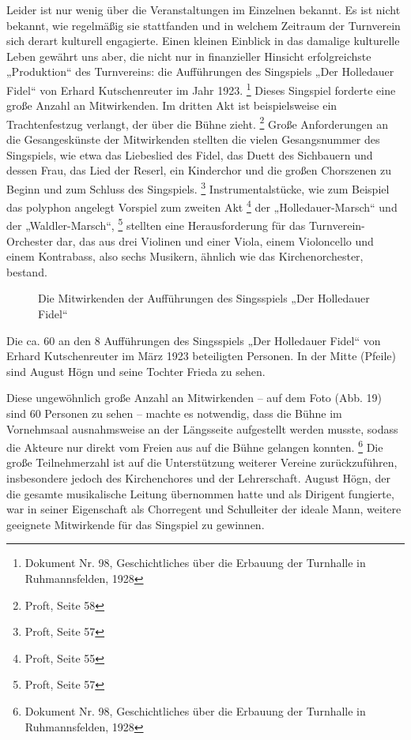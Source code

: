 Leider ist nur wenig über die Veranstaltungen im Einzelnen bekannt. Es
ist nicht bekannt, wie regelmäßig sie stattfanden und in welchem
Zeitraum der Turnverein sich derart kulturell engagierte. Einen kleinen
Einblick in das damalige kulturelle Leben gewährt uns aber, die nicht
nur in finanzieller Hinsicht erfolgreichste „Produktion“ des
Turnvereins: die Aufführungen des Singspiels „Der Holledauer Fidel“ von
Erhard Kutschenreuter im Jahr 1923. \footnote{Dokument Nr. 98,
Geschichtliches über die Erbauung der Turnhalle in Ruhmannsfelden,
1928} Dieses Singspiel forderte eine große Anzahl an Mitwirkenden. Im
dritten Akt ist beispielsweise ein Trachtenfestzug verlangt, der über
die Bühne zieht. \footnote{Proft, Seite 58} Große Anforderungen an die
Gesangeskünste der Mitwirkenden stellten die vielen Gesangsnummer des
Singspiels, wie etwa das Liebeslied des Fidel, das Duett des Sichbauern
und dessen Frau, das Lied der Reserl, ein Kinderchor und die großen
Chorszenen zu Beginn und zum Schluss des Singspiels. \footnote{Proft,
Seite 57} Instrumentalstücke, wie zum Beispiel das polyphon angelegt
Vorspiel zum zweiten Akt \footnote{Proft, Seite 55} der
„Holledauer-Marsch“ und der „Waldler-Marsch“, \footnote{Proft, Seite
57} stellten eine Herausforderung für das Turnverein-Orchester dar, das
aus drei Violinen und einer Viola, einem Violoncello und einem
Kontrabass, also sechs Musikern, ähnlich wie das Kirchenorchester,
bestand.

\begin{figure}
\caption{Die Mitwirkenden der Aufführungen des Singsspiels „Der
Holledauer Fidel“}
\end{figure}

Die ca. 60 an den 8 Aufführungen des Singsspiels „Der Holledauer Fidel“
von Erhard Kutschenreuter im März 1923 beteiligten Personen. In der
Mitte (Pfeile) sind August Högn und seine Tochter Frieda zu sehen.

Diese ungewöhnlich große Anzahl an Mitwirkenden – auf dem Foto (Abb. 19)
sind 60 Personen zu sehen – machte es notwendig, dass die Bühne im
Vornehmsaal ausnahmsweise an der Längsseite aufgestellt werden musste,
sodass die Akteure nur direkt vom Freien aus auf die Bühne gelangen
konnten. \footnote{Dokument Nr. 98, Geschichtliches über die Erbauung
der Turnhalle in Ruhmannsfelden, 1928} Die große Teilnehmerzahl ist auf
die Unterstützung weiterer Vereine zurückzuführen, insbesondere jedoch
des Kirchenchores und der Lehrerschaft. August Högn, der die gesamte
musikalische Leitung übernommen hatte und als Dirigent fungierte, war
in seiner Eigenschaft als Chorregent und Schulleiter der ideale Mann,
weitere geeignete Mitwirkende für das Singspiel zu gewinnen.

